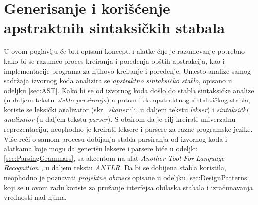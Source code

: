 \chapter[Apstraktna sintaksička stabla]{Generisanje i korišćenje apstraktnih sintaksičkih stabala}
\label{chp:RelevantTerms}

U ovom poglavlju će biti opisani koncepti i alatke čije je razumevanje potrebno kako bi se razumeo proces kreiranja i poređenja opštih apstrakcija, kao i implementacije programa za njihovo kreiranje i poređenje. Umesto analize samog sadržaja izvornog koda analizira se \emph{apstraktno sintaksičko stablo}, opisano u odeljku \ref{sec:AST}. Kako bi se od izvornog koda došlo do stabla sintaksičke analize (u daljem tekstu \emph{stablo parsiranja}) a potom i do apstraktnog sintaksičkog stabla, koriste se leksički analizator (skr.~\emph{skaner} ili, u daljem tekstu \emph{lekser}) i \emph{sintaksički analizator} (u daljem tekstu \emph{parser}). S obzirom da je cilj kreirati univerzalnu reprezentaciju, neophodno je kreirati leksere i parsere za razne programske jezike. Više reči o samom procesu dobijanja stabla parsiranja od izvornog koda i alatkama koje mogu da generišu leksere i parsere biće u odeljku \ref{sec:ParsingGrammars}, sa akcentom na alat \emph{Another Tool For Language Recognition} \cite{ANTLR}, u daljem tekstu \emph{ANTLR}. Da bi se dobijena stabla koristila, neophodno je poznavati \emph{projektne obrasce} opisane u odeljku \ref{sec:DesignPatterns} koji se u ovom radu koriste za pružanje interfejsa obilaska stabala i izračunavanja vrednosti nad njima.




